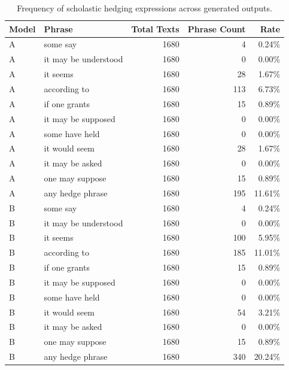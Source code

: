 \begin{table}[t]
\centering
\caption{Frequency of scholastic hedging expressions across generated outputs.}
\label{tab:full_hedging}
\begin{tabular}{l l r r r}
\hline
Model & Phrase & Total Texts & Phrase Count & Rate \\
\hline
A & some say & 1680 & 4 & 0.24\% \\
A & it may be understood & 1680 & 0 & 0.00\% \\
A & it seems & 1680 & 28 & 1.67\% \\
A & according to & 1680 & 113 & 6.73\% \\
A & if one grants & 1680 & 15 & 0.89\% \\
A & it may be supposed & 1680 & 0 & 0.00\% \\
A & some have held & 1680 & 0 & 0.00\% \\
A & it would seem & 1680 & 28 & 1.67\% \\
A & it may be asked & 1680 & 0 & 0.00\% \\
A & one may suppose & 1680 & 15 & 0.89\% \\
A & any hedge phrase & 1680 & 195 & 11.61\% \\
\hline
B & some say & 1680 & 4 & 0.24\% \\
B & it may be understood & 1680 & 0 & 0.00\% \\
B & it seems & 1680 & 100 & 5.95\% \\
B & according to & 1680 & 185 & 11.01\% \\
B & if one grants & 1680 & 15 & 0.89\% \\
B & it may be supposed & 1680 & 0 & 0.00\% \\
B & some have held & 1680 & 0 & 0.00\% \\
B & it would seem & 1680 & 54 & 3.21\% \\
B & it may be asked & 1680 & 0 & 0.00\% \\
B & one may suppose & 1680 & 15 & 0.89\% \\
B & any hedge phrase & 1680 & 340 & 20.24\% \\
\hline
\end{tabular}
\end{table}

